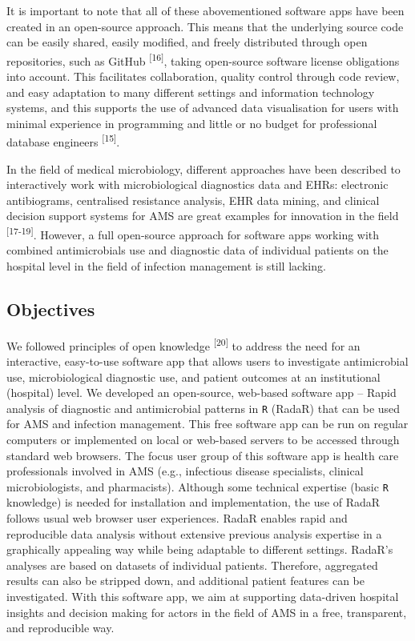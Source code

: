 \documentclass[
]{book}
\begin{document}
It is important to note that all of these abovementioned software apps have been created in an open-source approach. This means that the underlying source code can be easily shared, easily modified, and freely distributed through open repositories, such as GitHub \textsuperscript{{[}16{]}}, taking open-source software license obligations into account. This facilitates collaboration, quality control through code review, and easy adaptation to many different settings and information technology systems, and this supports the use of advanced data visualisation for users with minimal experience in programming and little or no budget for professional database engineers \textsuperscript{{[}15{]}}.

In the field of medical microbiology, different approaches have been described to interactively work with microbiological diagnostics data and EHRs: electronic antibiograms, centralised resistance analysis, EHR data mining, and clinical decision support systems for AMS are great examples for innovation in the field \textsuperscript{{[}17-19{]}}. However, a full open-source approach for software apps working with combined antimicrobials use and diagnostic data of individual patients on the hospital level in the field of infection management is still lacking.

\hypertarget{objectives}{%
\subsection{Objectives}\label{objectives}}

We followed principles of open knowledge \textsuperscript{{[}20{]}} to address the need for an interactive, easy-to-use software app that allows users to investigate antimicrobial use, microbiological diagnostic use, and patient outcomes at an institutional (hospital) level. We developed an open-source, web-based software app -- Rapid analysis of diagnostic and antimicrobial patterns in \texttt{R} (RadaR) that can be used for AMS and infection management. This free software app can be run on regular computers or implemented on local or web-based servers to be accessed through standard web browsers. The focus user group of this software app is health care professionals involved in AMS (e.g., infectious disease specialists, clinical microbiologists, and pharmacists). Although some technical expertise (basic \texttt{R} knowledge) is needed for installation and implementation, the use of RadaR follows usual web browser user experiences. RadaR enables rapid and reproducible data analysis without extensive previous analysis expertise in a graphically appealing way while being adaptable to different settings. RadaR's analyses are based on datasets of individual patients. Therefore, aggregated results can also be stripped down, and additional patient features can be investigated. With this software app, we aim at supporting data-driven hospital insights and decision making for actors in the field of AMS in a free, transparent, and reproducible way.
\end{document}
